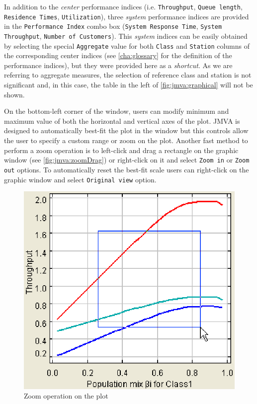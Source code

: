 In addition to the \emph{center} performance indices (i.e.
\texttt{Throughput}, \texttt{Queue length}, \texttt{Residence
Times}, \texttt{Utilization}), three \emph{system} performance
indices are provided  in the \texttt{Performance Index} combo box
(\texttt{System Response Time}, \texttt{System Throughput},
\texttt{Number of Customers}). This \emph{system} indices can be
easily obtained by selecting the special \texttt{Aggregate} value
for both \texttt{Class} and \texttt{Station} columns of the
corresponding center indices (see \autoref{cha:glossary} for the
definition of the performance indices), but they were provided here
as a \emph{shortcut}. As we are referring to aggregate measures, the
selection of reference class and station is not significant and, in
this case, the table in the left of \autoref{fig:jmva:graphical}
will not be shown.

On the bottom-left corner of the window, users can modify minimum
and maximum value of both the horizontal and vertical axes of the plot. JMVA is designed
to automatically best-fit the plot in the window but this controls
allow the user to specify a custom range or zoom on the plot.
Another fast method to perform a zoom operation is to left-click and
drag a rectangle on the graphic window (see
\autoref{fig:jmva:zoomDrag}) or right-click on it and select
\texttt{Zoom in} or \texttt{Zoom out} options. To automatically
reset the best-fit scale users can right-click on the graphic window
and select \texttt{Original view} option.

\begin{figure}[htbp]
    \begin{center}
        \includegraphics[scale=.5]{img/jmva/whatIfDrag}
    \end{center}
    \caption{Zoom operation on the plot}
    \label{fig:jmva:zoomDrag}
\end{figure}

